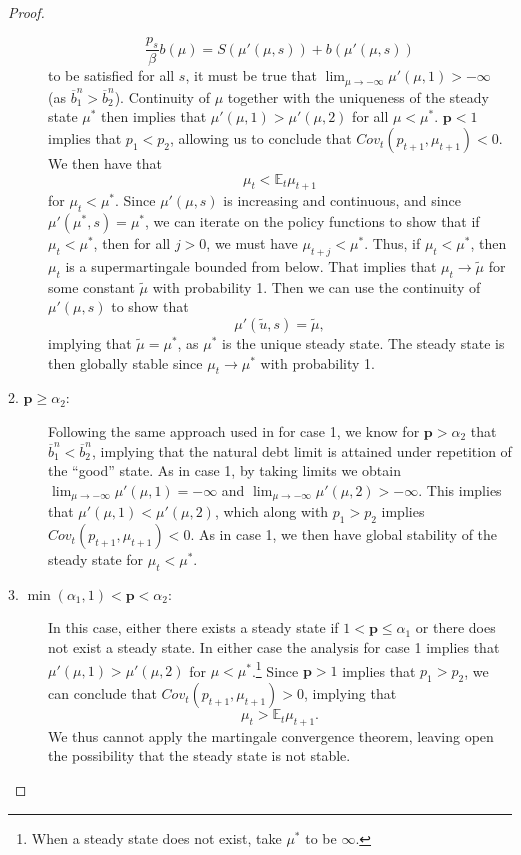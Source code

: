 \documentclass[12pt]{article}
\newcommand{\apb}[1]{\textcolor{magenta}{$^{\textrm{apb}}${#1}}}
\newcommand{\EE}{\mathbb E}
\begin{document}
\begin{proof}
\begin{description}
	\[
		\frac{p_s}{\beta}b(\mu) = S(\mu'(\mu,s))+b(\mu'(\mu,s))
	\] to be satisfied for all $s$, it must be true that $\lim_{\mu\rightarrow -\infty} \mu'(\mu,1) >-\infty$ (as $\overline b^n_1 > \overline b^n_2$).  Continuity of $\mu$ together with the uniqueness of the steady state $\mu^*$ then implies that $\mu'(\mu,1) > \mu'(\mu,2)$ for all $\mu < \mu^*$.
	$\bm p < 1$ implies that $p_1 < p_2$, allowing us to conclude that $Cov_t(p_{t+1},\mu_{t+1}) < 0$.  We then have that
	\[
		\mu_t < \EE_t\mu_{t+1}
	\] for $\mu_t < \mu^*$.  Since $\mu'(\mu,s)$ is increasing and  continuous, and since $\mu'(\mu^*,s) = \mu^*$, we can iterate on the policy functions to show that if $\mu_t < \mu^*$, then for all $j> 0$, we must have $\mu_{t+j} <\mu^*$.  Thus, if $\mu_t <\mu^*$, then $\mu_t$ is a supermartingale bounded from below. That implies  that $\mu_t\rightarrow \tilde\mu$ for some constant $\tilde\mu$ with probability 1.  Then  we
can use  the continuity of $\mu'(\mu,s)$ to show that
	\[
		\mu'(\tilde u,s) = \tilde \mu,
	\] implying that $\tilde \mu =\mu^*$, as $\mu^*$ is the unique steady state.  The steady state is then globally stable since $\mu_t \rightarrow \mu^*$ with probability 1.
	\item[2. $\bm p \geq \alpha_2$:]  Following the same approach used  in for case 1, we know for $\bm p > \alpha_2$ that $\overline b^n_1 < \overline b^n_2$, implying that the natural debt limit is attained under repetition of  the ``good'' state.  As in case 1,  by taking limits we obtain $\lim_{\mu\rightarrow-\infty} \mu'(\mu,1) = -\infty$ and $\lim_{\mu\rightarrow-\infty}\mu'(\mu,2) > -\infty$.  This implies that $\mu'(\mu,1) < \mu'(\mu,2)$, which along with $p_1 > p_2$ implies $Cov_t(p_{t+1},\mu_{t+1}) <0$.  As in case 1, we then have global stability of the steady state for $\mu_t < \mu^*$.
	\item[3. $\min(\alpha_1,1) < \bm p < \alpha_2$:]   In this case, either there exists a steady state if $1 < \bm p \leq \alpha_1$ or there does not exist a steady state.  In either case the analysis for case 1 implies that $\mu'(\mu,1) > \mu'(\mu,2)$ for $\mu < \mu ^*$.\footnote{When
 a steady state does not exist, take $\mu^*$ to be $\infty$.}  Since $\bm p >1$ implies that $p_1 > p_2$, we can  conclude that $Cov_t(p_{t+1},\mu_{t+1}) > 0$, implying that
	\[
		\mu_t > \EE_t \mu_{t+1}.
	\]We thus cannot apply the martingale convergence theorem, leaving open the possibility that the steady state is not stable.
\end{description}
\end{proof}
\end{document}
